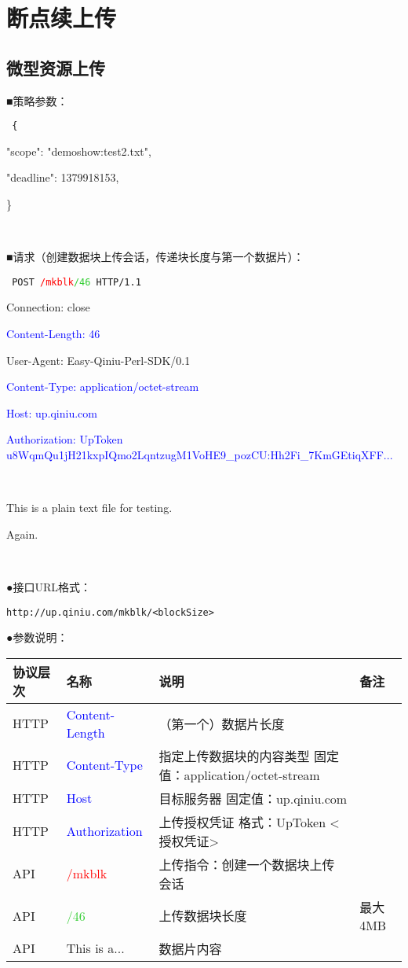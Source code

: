 \documentclass[11pt, oneside]{book}
\newcommand{\qblock}[1]{
\vspace{0.1em}
\noindent
#1\par
\vspace{0.1em}
}
\newcommand{\qtable}[1]{\footnotesize\vspace{0.5em}#1\vspace{0.5em}\normalsize}
\newcommand{\qhttp}[1]{\noindent #1\par}
\begin{document}
\section{断点续上传}

\subsection{微型资源上传}

\qblock{■\thinspace 策略参数：}
{
\tt \footnotesize
\qhttp{\{}
\qhttp{    "scope":    "demoshow:test2.txt",}
\qhttp{    "deadline": 1379918153,}
\qhttp{\}}
\qhttp{\ }
}

\qblock{■\thinspace 请求（创建数据块上传会话，传递块长度与第一个数据片）：}
{
\tt \footnotesize
\qhttp{POST \textcolor{red}{/mkblk}\textcolor{LimeGreen}{/46} HTTP/1.1}
\qhttp{Connection: close}
\qhttp{\textcolor{blue}{Content-Length: 46}}
\qhttp{User-Agent: Easy-Qiniu-Perl-SDK/0.1}
\qhttp{\textcolor{blue}{Content-Type: application/octet-stream}}
\qhttp{\textcolor{blue}{Host: up.qiniu.com}}
\qhttp{\textcolor{blue}{Authorization: UpToken u8WqmQu1jH21kxpIQmo2LqntzugM1VoHE9\_pozCU:Hh2Fi\_7KmGEtiqXFF...}}
\qhttp{\ }
\qhttp{\textcolor{YellowOrange}{This is a plain text file for testing.}}
\qhttp{\textcolor{YellowOrange}{Again.}}
\qhttp{\ }
}

\qblock{●\thinspace 接口URL格式：}
\begin{lstlisting}
http://up.qiniu.com/mkblk/<blockSize>
\end{lstlisting}

\qblock{●\thinspace 参数说明：}
\qtable{
\def\arraystretch{2}
\begin{tabular}{|l|p{9em}|p{17em}|p{7em}|}
\hline
协议层次 & 名称 & 说明 & 备注 \\
\hline
HTTP & \textcolor{blue}{Content-Length} & （第一个）数据片长度 & \\
\hline
HTTP & \textcolor{blue}{Content-Type} & 指定上传数据块的内容类型 \newline 固定值：application/octet-stream & \\
\hline
HTTP & \textcolor{blue}{Host} & 目标服务器 \newline 固定值：up.qiniu.com & \\
\hline
HTTP & \textcolor{blue}{Authorization} & 上传授权凭证 \newline 格式：UpToken <授权凭证> & \\
\hline
API & \textcolor{red}{/mkblk} & 上传指令：创建一个数据块上传会话 & \\
\hline
API & \textcolor{LimeGreen}{/46} & 上传数据块长度 & 最大4MB \\
\hline
API & \textcolor{YellowOrange}{This is a...} & 数据片内容 & \\
\hline
\end{tabular}
}
\end{document}

